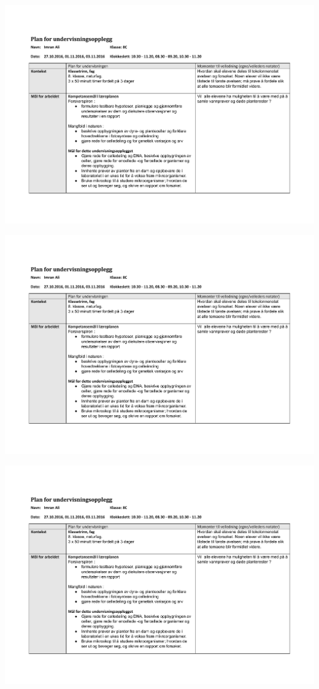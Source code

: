\documentclass[main.tex]{subfiles}
\begin{document}
\hspace{-2cm}\vspace{-5cm}\includegraphics[page = 1,scale = 0.9,angle=90]{../figures/Del_B_plan_for_undervisningsopplegg.pdf}

\hspace{-3cm}\vspace{-5cm}\includegraphics[page = 2,scale = 0.9,angle=90]{../figures/Del_B_plan_for_undervisningsopplegg.pdf}

\hspace{-2cm}\vspace{-5cm}\includegraphics[page = 3,scale = 0.9,angle=90]{../figures/Del_B_plan_for_undervisningsopplegg.pdf}
\end{document}
